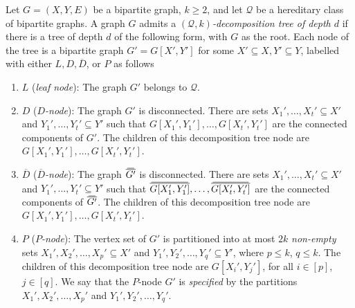 \documentclass{article}
\newcommand{\cQ}{\ensuremath{\mathcal{Q}}}
\newcommand\doverline[1]{%
  \setbox0=\hbox{$\!\overline{#1}\!$}%
  \ht0=\dimexpr\ht0-.2ex\relax%
  \,\overline{\copy0}\,%
}
\newcommand{\bc}[1]{\doverline{#1}} %
\begin{document}
\begin{definition}[$(\cQ,k)$-decomposition tree]
\label{Qkd decomposition tree}
Let $G=(X,Y,E)$ be a bipartite graph, $k \geq 2$, and let $\cQ$ be a hereditary class of bipartite
graphs.  A graph $G$ admits a \emph{$(\cQ,k)$-decomposition tree of depth $d$} if there is a tree of
depth $d$ of the following form, with $G$ as the root. Each node of the tree is a bipartite graph
$G' = G[X',Y']$ for some $X' \subseteq X, Y' \subseteq Y$, labelled with either $L, D, \overline D$,
or $P$ as follows
	
	\begin{enumerate}[label=\textup{(\arabic*)}]
		\item $L$ (\emph{leaf node}): The graph $G'$ belongs to $\cQ$.
		
		\item $D$ (\emph{$D$-node}): The graph $G'$ is disconnected. 
		There are sets $X_1', \dotsc, X_t' \subseteq X'$ and $Y_1', \dotsc, Y_t' \subseteq Y'$ 
		such that $G[X_1',Y_1'], \dotsc, G[X_t',Y_t']$ are the connected components of $G'$. 
		The children of this decomposition tree node are $G[X_1',Y_1'], \dotsc, G[X_t',Y_t']$.
		
		\item $\overline D$ (\emph{$\overline{D}$-node}): The graph $\bc{G'}$ is disconnected. 
		There are sets $X_1', \dotsc, X_t' \subseteq X'$ and $Y_1', \dotsc, Y_t' \subseteq Y'$ 
		such that $\bc{G[X_1',Y_1']}, \dotsc,  \bc{G[X_t',Y_t']}$ 
		are the connected components of $\bc{G'}$. 
		The children of this decomposition tree node are $G[X_1',Y_1'], \dotsc, G[X_t',Y_t']$.
		
		\item $P$ (\emph{$P$-node}):
		The vertex set of $G'$ is partitioned into at most $2k$ \emph{non-empty} sets $X_1', X_2', \ldots, X_p' \subseteq X'$ and $Y_1', Y_2', \ldots, Y_q' \subseteq Y'$, 
		where $p \leq k$, $q \leq k$. The children of this decomposition tree node are $G[X_i', Y_j']$, for all $i \in[p]$,  $j \in [q]$.
		We say that the $P$-node $G'$ is \emph{specified} by the partitions $X_1', X_2', \ldots, X_p'$ and 
		$Y_1', Y_2', \ldots, Y_q'$.
	\end{enumerate}
\end{definition}
\end{document}
